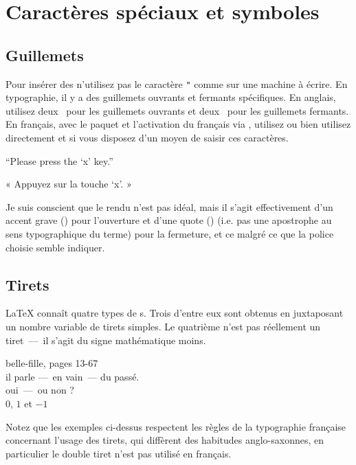 \section{Caractères spéciaux et symboles}

\subsection{Guillemets}

Pour insérer des  n'utilisez pas le caractère \verb|"|
 comme sur une machine à écrire. En typographie,
il y a des guillemets ouvrants et fermants spécifiques. En anglais,
utilisez deux~\textasciigrave{} pour les guillemets ouvrants et
deux~\textquotesingle{}
pour les guillemets fermants.
En français, avec le paquet  et l'activation du français via ,
utilisez  ou bien utilisez directement
\texttt{\guillemotleft} et
\texttt{\guillemotright} si vous disposez d'un moyen de saisir ces caractères.
\begin{example}
``Please press the `x' key.''

« Appuyez sur la touche `x'. »
\end{example}
Je suis conscient que le rendu n'est pas idéal, mais il s'agit
effectivement d'un accent grave (\textasciigrave) pour l'ouverture et
d'une quote (\textquotesingle) (i.e. pas une apostrophe au sens
typographique du terme) pour la fermeture, et ce malgré ce que la
police choisie semble indiquer.

\subsection{Tirets}

\LaTeX{} connaît quatre types de s. Trois d'entre eux sont
obtenus en juxtaposant un nombre variable de tirets simples. Le
quatrième n'est  pas réellement un tiret~---~il s'agit du signe
mathématique moins. \index{-} \index{--} \index{---} 

\begin{example}
belle-fille, pages 13-67\\
il parle ---~en vain~---
du passé.\\
oui~---~ou non ? \\
$0$, $1$ et $-1$
\end{example}

Notez que les exemples ci-dessus respectent les règles de la
typographie française concernant l'usage des tirets, qui diffèrent
des habitudes anglo-saxonnes, en particulier le double tiret n'est pas
utilisé en français.

